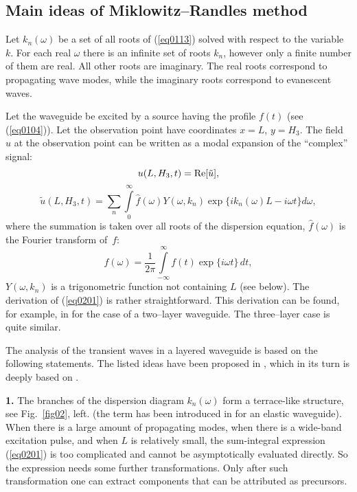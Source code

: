 \documentclass[12pt]{article}
\begin{document}
\subsection{Main ideas of Miklowitz--Randles method}


Let $k_n (\omega)$ be a set of all roots of (\ref{eq0113}) solved with respect to 
the variable~$k$. For each real $\omega$ there is an infinite set of roots $k_n$, 
however only a finite number of them are real. All other roots are imaginary. The real 
roots correspond to propagating wave modes, while the imaginary roots correspond to 
evanescent waves. 

Let the waveguide be excited by a source having the profile $f(t)$ 
(see (\ref{eq0104})). 
Let the observation point have coordinates $x = L$, $y = H_3$.    
The field $u$ at the observation point can be written as a modal expansion
of the ``complex'' signal:
\[
u(L,H_3,t) = {\rm Re} [\tilde u], 
\]
\begin{equation}
\tilde u (L, H_3, t) = \sum_n \int \limits_{0}^{\infty}
\hat f(\omega) Y(\omega, k_n) \exp \{ i k_n (\omega) L - i \omega t \} 
d\omega , 
\label{eq0201}
\end{equation}
where the summation is taken over all roots of the dispersion equation, 
$\hat f(\omega)$ is the Fourier 
transform of~$f$:
\begin{equation}
\hat f(\omega) = \frac{1}{2\pi} \int \limits_{-\infty}^{\infty}
f(t) \exp \{ i \omega t \} \, d t, 
\label{eq0202}
\end{equation} 
$Y (\omega, k_n)$ is a trigonometric function not containing $L$ (see below). 
The derivation of (\ref{eq0201}) is rather straightforward. This derivation can be found, for example, 
in \cite{Shanin} for the case of a two--layer waveguide. The three--layer case is quite similar. 

The analysis of the transient waves in a layered waveguide is based on the following statements. 
The listed ideas have been proposed in \cite{Shanin}, which in its turn is deeply based on 
\cite{Miklowitz}. 

{\bf 1.} The branches of the dispersion diagram $k_n (\omega)$ form a terrace-like structure,
see Fig.~\ref{fig02}, left.
(the term has been introduced in \cite{Mindlin} for an elastic waveguide). When there is 
a large amount of propagating modes, when there is a wide-band excitation pulse, and when 
$L$ is relatively small, 
the sum-integral
expression (\ref{eq0201}) is too complicated and cannot be asymptotically evaluated directly. So the expression needs some further transformations. Only after such transformation one can extract components that can be attributed as precursors.    
\end{document}
